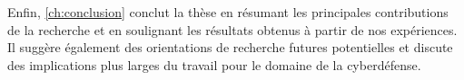 Enfin, \autoref{ch:conclusion} conclut la thèse en résumant les principales contributions de la recherche et en soulignant les résultats obtenus à partir de nos expériences. Il suggère également des orientations de recherche futures potentielles et discute des implications plus larges du travail pour le domaine de la cyberdéfense.





